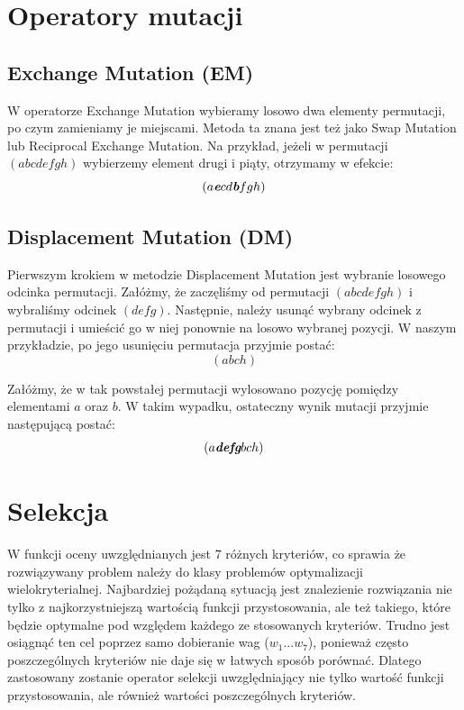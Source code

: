 \documentclass[brudnopis]{xmgr}
\begin{document}
\section{Operatory mutacji}

\subsection{Exchange Mutation (EM)}

W operatorze Exchange Mutation wybieramy losowo dwa elementy permutacji, po czym zamieniamy je miejscami. Metoda ta znana jest też jako Swap Mutation lub Reciprocal Exchange Mutation. Na przykład, jeżeli w permutacji $ (a b c d e f g h) $ wybierzemy element drugi i piąty, otrzymamy w efekcie:
$$ (a \textit{\textbf{e}} c d \textit{\textbf{b}} f g h) $$

\subsection{Displacement Mutation (DM)}

Pierwszym krokiem w metodzie Displacement Mutation jest wybranie losowego odcinka permutacji. Załóżmy, że zaczęliśmy od permutacji $ (a b c d e f g h) $ i wybraliśmy odcinek $ (d e f g) $. Następnie, należy usunąć wybrany odcinek z permutacji i umieścić go w niej ponownie na losowo wybranej pozycji. W naszym przykładzie, po jego usunięciu permutacja przyjmie postać:
$$ (a b c h) $$

Załóżmy, że w tak powstałej permutacji wylosowano pozycję pomiędzy elementami $a$ oraz $b$. W takim wypadku, ostateczny wynik mutacji przyjmie następującą postać:
$$ (a \textit{\textbf{defg}} b c h) $$


\section{Selekcja}

W funkcji oceny uwzględnianych jest 7 różnych kryteriów, co sprawia że rozwiązywany problem należy do klasy problemów optymalizacji wielokryterialnej. Najbardziej pożądaną sytuacją jest znalezienie rozwiązania nie tylko z najkorzystniejszą wartością funkcji przystosowania, ale też takiego, które będzie optymalne pod względem każdego ze stosowanych kryteriów. Trudno jest osiągnąć ten cel poprzez samo dobieranie wag ($w_1 ... w_7$), ponieważ często poszczególnych kryteriów nie daje się w łatwych sposób porównać. Dlatego zastosowany zostanie operator selekcji uwzględniający nie tylko wartość funkcji przystosowania, ale również wartości poszczególnych kryteriów.
\end{document}
